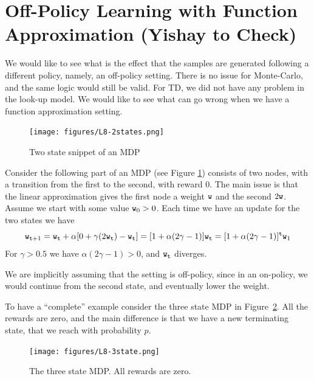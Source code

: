 \section{Off-Policy Learning with Function Approximation (Yishay to Check)}
\label{sec:off_policy_FA}

We would like to see what is the effect that the samples are generated
following a different policy, namely, an off-policy setting. There
is no issue for Monte-Carlo, and the same logic would still be
valid.  For TD, we did not have any problem in the look-up model. We
would like to see what can go wrong when we have a function
approximation setting.


\begin{figure}
  \begin{centering}
  \texttt{[image: figures/L8-2states.png]}\\
  \caption{Two state snippet of an MDP }\label{fig:L8-2state}
  \end{centering}
\end{figure}

Consider the following part of an MDP (see Figure
\ref{fig:L8-2state}) consists of two nodes, with a transition from
the first to the second, with reward $0$. The main issue is that the
linear approximation gives the first node a weight ${\tt w}$ and the
second $2{\tt w}$. Assume we start with some value ${\tt w}_0>0$.
Each time we have an update for the two states we have
\[
{\tt w}_{{\tt t}+1}={\tt w}_{\tt t} +\alpha[0+\gamma
(2{\tt w}_{\tt t})-{\tt w}_{\tt t}]=[1+\alpha(2\gamma-1)]{\tt w}_{\tt t}=[1+\alpha(2\gamma-1)]^{\tt t}{\tt w}_1
\]
For $\gamma>0.5$ we have $\alpha(2\gamma-1)>0$, and ${\tt w}_{\tt t}$
diverges.

We are implicitly assuming that the setting is off-policy, since in
an on-policy, we would continue from the second state, and
eventually lower the weight.

To have a ``complete'' example consider the three state MDP in
Figure~\ref{fig:L8-3state}. All the rewards are zero, and the main
difference is that we have a new terminating state, that we reach
with probability $p$.

\begin{figure}
  \begin{centering}
  \texttt{[image: figures/L8-3state.png]}\\
  \caption{The three state MDP. All rewards are zero.}\label{fig:L8-3state}
  \end{centering}
\end{figure}




